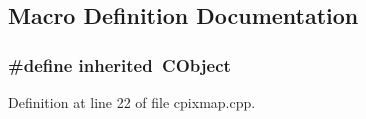 \subsection{Macro Definition Documentation}
\subsubsection[{inherited}]{\setlength{\rightskip}{0pt plus 5cm}\#define inherited~C\-Object}\label{cpixmap_8cpp_a3920e3b7cb0909b941b2409493acf8f1}


Definition at line 22 of file cpixmap.\-cpp.

